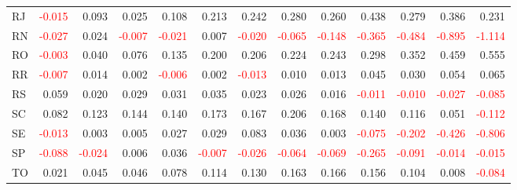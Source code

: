 \begin{table}[!htb]
{\begin{tabular}{lrrrrrrrrrrrr}
      RJ & \textcolor{red}{-0.015} & 0.093 & 0.025 & 0.108 & 0.213 & 0.242 & 0.280 & 0.260 & 0.438 & 0.279 & 0.386 & 0.231 \\
      RN & \textcolor{red}{-0.027} & 0.024 & \textcolor{red}{-0.007} & \textcolor{red}{-0.021} & 0.007 & \textcolor{red}{-0.020} & \textcolor{red}{-0.065} & \textcolor{red}{-0.148} & \textcolor{red}{-0.365} & \textcolor{red}{-0.484} & \textcolor{red}{-0.895} & \textcolor{red}{-1.114} \\
      RO & \textcolor{red}{-0.003} & 0.040 & 0.076 & 0.135 & 0.200 & 0.206 & 0.224 & 0.243 & 0.298 & 0.352 & 0.459 & 0.555 \\
      RR & \textcolor{red}{-0.007} & 0.014 & 0.002 & \textcolor{red}{-0.006} & 0.002 & \textcolor{red}{-0.013} & 0.010 & 0.013 & 0.045 & 0.030 & 0.054 & 0.065 \\
      RS & 0.059 & 0.020 & 0.029 & 0.031 & 0.035 & 0.023 & 0.026 & 0.016 & \textcolor{red}{-0.011} & \textcolor{red}{-0.010} & \textcolor{red}{-0.027} & \textcolor{red}{-0.085} \\
      SC & 0.082 & 0.123 & 0.144 & 0.140 & 0.173 & 0.167 & 0.206 & 0.168 & 0.140 & 0.116 & 0.051 & \textcolor{red}{-0.112} \\
      SE & \textcolor{red}{-0.013} & 0.003 & 0.005 & 0.027 & 0.029 & 0.083 & 0.036 & 0.003 & \textcolor{red}{-0.075} & \textcolor{red}{-0.202} & \textcolor{red}{-0.426} & \textcolor{red}{-0.806} \\
      SP & \textcolor{red}{-0.088} & \textcolor{red}{-0.024} & 0.006 & 0.036 & \textcolor{red}{-0.007} & \textcolor{red}{-0.026} & \textcolor{red}{-0.064} & \textcolor{red}{-0.069} & \textcolor{red}{-0.265} & \textcolor{red}{-0.091} & \textcolor{red}{-0.014} & \textcolor{red}{-0.015} \\
      TO & 0.021 & 0.045 & 0.046 & 0.078 & 0.114 & 0.130 & 0.163 & 0.166 & 0.156 & 0.104 & 0.008 & \textcolor{red}{-0.084} \\
      \hline
    \end{tabular}%
  }
  \label{tab:adm_sh}
\end{table}

